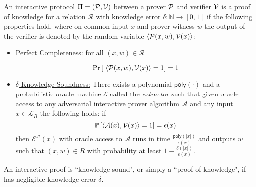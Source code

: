 \begin{definition} \label{def:proof}
  
An interactive protocol $\Pi = (\mathcal{P}, \mathcal{V})$ between a prover $\mathcal{P}$ and verifier $\mathcal{V}$ is a proof of knowledge for a relation $\mathcal{R}$ with knowledge error $\delta: \mathbb{N} \rightarrow [0,1]$ if the following properties hold, where on common input $x$ and prover witness $w$ the output of the verifier is denoted by the random variable $\langle \mathcal{P}(x,w), \mathcal{V}(x) \rangle$:

\begin{itemize}
\item \underline{Perfect Completeness:} for all $(x,w) \in \mathcal{R}$
\begin{small}
\[
\Pr \left[
         \ \langle \mathcal{P}(x,w), \mathcal{V}(x) \rangle = 1  
\right]  = 1 
 \]
 \end{small}
\item \underline{$\delta$-Knowledge Soundness:}
There exists a polynomial $\textsf{poly}(\cdot)$ and a probabilistic oracle machine $\mathcal{E}$ called the \emph{extractor} such that given oracle access to any adversarial interactive prover algorithm $\mathcal{A}$ and any input $x \in \mathcal{L}_R$ the following holds: if
$$\mathbb{P}\left[\langle \mathcal{A}(x), \mathcal{V}(x) \rangle = 1 \right] = \epsilon(x)$$
 then $\mathcal{E}^\mathcal{A}(x)$ with oracle access to $\mathcal{A}$ runs in time $\frac{\mathsf{poly}(|x|)}{\epsilon(x)}$ and outputs $w$ such that $(x, w) \in R$ with probability at least $1 - \frac{\delta(|x|)}{\epsilon(x)}$. 
\end{itemize} 
An interactive proof is ``knowledge sound", or simply a ``proof of knowledge", if has negligible knowledge error $\delta$. 
\end{definition} 
